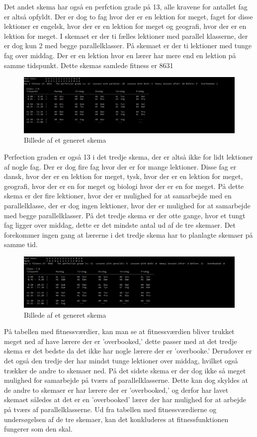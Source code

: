Det andet skema har også en perfction grade på 13, alle kravene for antallet fag er altså opfyldt. Der er dog to fag hvor der er en lektion for meget, faget for disse lektioner er engelsk, hvor der er en lektion for meget og geografi, hvor der er en lektion for meget. I skemaet er der ti fælles lektioner med parallel klasserne, der er dog kun 2 med begge parallelklasser. På skemaet er der ti lektioner med tunge fag over middag. Der er en lektion hvor en lærer har mere end en lektion på samme tidspunkt. Dette skemas samlede fitness er 8631
\begin{figure}[!h]
\includegraphics{partials/graphics/fitness2.png}
\caption{Billede af et generet skema}
\label{fitness2}
\end{figure}

Perfection graden er også 13 i det tredje skema, der er altså ikke for lidt lektioner af nogle fag. Der er dog fire fag hvor der er for mange lektioner. Disse fag er dansk, hvor der er en lektion for meget, tysk, hvor der er en lektion for meget, geografi, hvor der er en for meget og biologi hvor der er en for meget. På dette skema er der fire lektioner, hvor der er mulighed for at samarbejde med en parallelklasse, der er dog ingen lektioner, hvor der er mulighed for at samarbejde med begge parallelklasser. På det tredje skema er der otte gange, hvor et tungt fag ligger over middag, dette er det mindste antal ud af de tre skemaer. Det forekommer ingen gang at lærerne i det tredje skema har to planlagte skemaer på samme tid. 
\begin{figure}[!h]
\includegraphics{partials/graphics/fitness3.png}
\caption{Billede af et generet skema}
\label{fitness3}
\end{figure}

På tabellen med fitnessværdier, kan man se at fitnessværdien bliver trukket meget ned af have lærere der er ’overbooked,’ dette passer med at det tredje skema er det bedste da det ikke har nogle lærere der er ’overbooke.’ Derudover er det også den tredje der har mindst tunge lektioner over middag, hvilket også trækker de andre to skemaer ned. På det sidste skema er der dog ikke så meget mulighed for samarbejde på tværs af parallelklasserne. Dette kan dog skyldes at de andre to skemaer er har lærere der er ’overbooked,’ og derfor har lavet skemaet således at det er en ’overbooked’ lærer der har mulighed for at arbejde på tværs af parallelklasserne.
Ud fra tabellen med fitnessværdierne og undersøgelsen af de tre skemaer, kan det konkluderes at fitnessfunktionen fungerer som den skal. 
